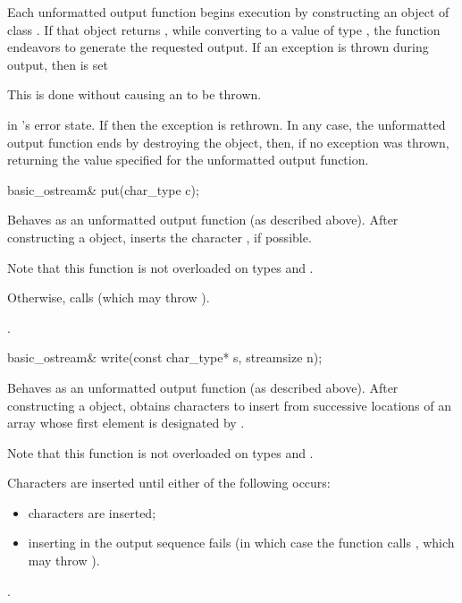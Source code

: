 \pnum
Each
unformatted
output function begins execution by constructing an object of class
.
If that object returns
,
while converting to a value of type
,
the function endeavors
to generate the requested output.
If an exception is thrown during output, then
is set
\begin{footnote}
This is done without causing an
to be thrown.
\end{footnote}
in
's
error state.
If
then the exception is rethrown.
In any case, the unformatted output function ends by destroying the
 object, then, if no exception was thrown, returning the value
specified for the unformatted output function.

%
\begin{itemdecl}
basic_ostream& put(char_type c);
\end{itemdecl}

\begin{itemdescr}
\pnum
\effects
Behaves as an unformatted output function (as described above).
After constructing a 
object, inserts
the character , if possible.
\begin{footnote}
Note that this function is not overloaded on types
and
.
\end{footnote}

\pnum
Otherwise, calls
(which may throw
).

\pnum
\returns
{}.
\end{itemdescr}

%
\begin{itemdecl}
basic_ostream& write(const char_type* s, streamsize n);
\end{itemdecl}

\begin{itemdescr}
\pnum
\effects
Behaves as an unformatted output function (as described above).  After constructing a 
object, obtains
characters to insert from
successive locations of an array whose first element is designated by
.
\begin{footnote}
Note that this function is not overloaded on types
and
.
\end{footnote}
Characters are inserted until either of the following occurs:
\begin{itemize}
\item
{} characters are inserted;
\item
inserting in the output sequence fails
(in which case the function calls
,
which may throw
).
\end{itemize}

\pnum
\returns
{}.
\end{itemdescr}

